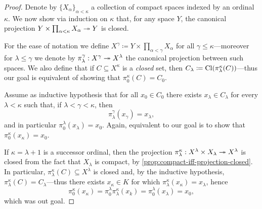 \begin{proof}
    Denote by \(\{X_{\alpha}\}_{\alpha < \kappa}\) a collection of compact spaces
    indexed by an ordinal \(\kappa\). We now show via induction on \(\kappa\) that,
    for any space \(Y\), the canonical projection
    \(Y \times \prod_{\alpha < \kappa} X_{\alpha} \twoheadrightarrow Y\) is closed.

    For the ease of notation we define
    \(X^{\gamma} \coloneq Y \times \prod_{\alpha < \gamma} X_{\alpha}\) for all
    \(\gamma \leq \kappa\)---moreover for \(\lambda \leq \gamma\) we denote by
    \(\pi_{\lambda}^{\gamma}: X^{\gamma} \twoheadrightarrow X^{\lambda}\) the canonical projection
    between such spaces. We also define that if \(C \subseteq X^{\kappa}\) is a
    \emph{closed} set, then
    \(C_{\lambda} \coloneq \operatorname{Cl}(\pi_{\lambda}^{\kappa}(C))\)---thus our goal is
    equivalent of showing that \(\pi_0^{\kappa}(C) = C_0\).

    Assume as inductive hypothesis that for all \(x_0 \in C_0\) there exists
    \(x_{\lambda} \in C_{\lambda}\) for every \(\lambda < \kappa\) such that, if
    \(\lambda < \gamma < \kappa\), then
    \[
        \pi_{\lambda}^{\gamma}(x_{\gamma}) = x_{\lambda},
    \]
    and in particular \(\pi_0^{\lambda}(x_{\lambda}) = x_0\). Again, equivalent to
    our goal is to show that \(\pi_0^{\kappa}(x_{\kappa}) = x_0\).

    If \(\kappa = \lambda + 1\) is a successor ordinal, then the projection
    \(\pi_{\lambda}^{\kappa}: X^{\lambda} \times X_{\lambda} \twoheadrightarrow X^{\lambda}\) is
    closed from the fact that \(X_{\lambda}\) is compact, by
    \cref{prop:compact-iff-projection-closed}. In particular,
    \(\pi_{\lambda}^{\kappa}(C) \subseteq X^{\lambda}\) is closed and, by the
    inductive hypothesis, \(\pi_{\lambda}^{\kappa}(C) = C_{\lambda}\)---thus there
    exists \(x_{\kappa} \in K\) for which
    \(\pi_{\lambda}^{\kappa}(x_{\kappa}) = x_{\lambda}\), hence
    \[
        \pi_0^{\kappa}(x_{\kappa})
        = \pi_0^{\lambda} \pi_{\lambda}^{\kappa}(x_k)
        = \pi_0^{\lambda}(x_{\lambda})
        = x_0,
    \]
    which was out goal.


\end{proof}
